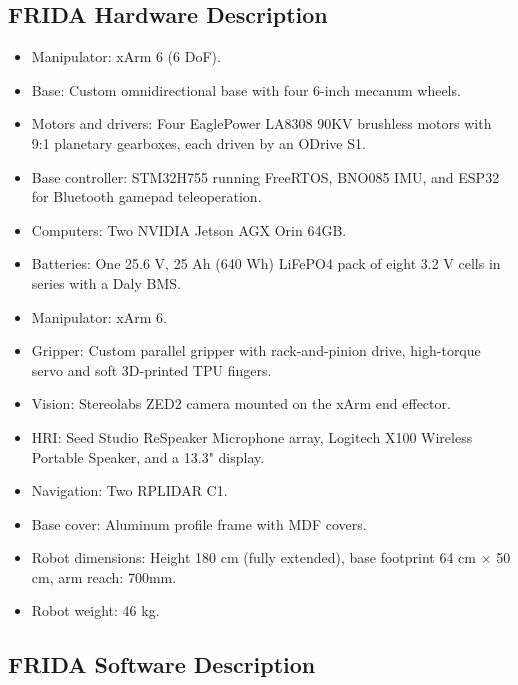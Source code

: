 
\subsection*{FRIDA Hardware Description}
\label{sec:annex-OPL}

\setlength\intextsep{0pt}
\begin{itemize}
    \item Manipulator: xArm 6 (6 DoF).
	\item Base: Custom omnidirectional base with four 6-inch mecanum wheels.
	\item Motors and drivers: Four EaglePower LA8308 90KV brushless motors with 9:1 planetary gearboxes, each driven by an ODrive S1.
	\item Base controller: STM32H755 running FreeRTOS, BNO085 IMU, and ESP32 for Bluetooth gamepad teleoperation.
	\item Computers: Two NVIDIA Jetson AGX Orin 64GB.
	\item Batteries: One 25.6 V, 25 Ah (640 Wh) LiFePO4 pack of eight 3.2 V cells in series with a Daly BMS.
	\item Manipulator: xArm 6.
    \item Gripper: Custom parallel gripper with rack-and-pinion drive, high-torque servo and soft 3D-printed TPU fingers.
	\item Vision: Stereolabs ZED2 camera mounted on the xArm end effector.
        \item HRI: Seed Studio ReSpeaker Microphone array, Logitech X100 Wireless Portable Speaker, and a 13.3" display.
        \item Navigation: Two RPLIDAR C1.
        \item Base cover: Aluminum profile frame with MDF covers.
	\item Robot dimensions: Height 180 cm (fully extended), base footprint 64 cm $\times$ 50 cm, arm reach: 700mm.
	\item Robot weight: 46 kg.
\end{itemize}

\subsection*{FRIDA Software Description}

